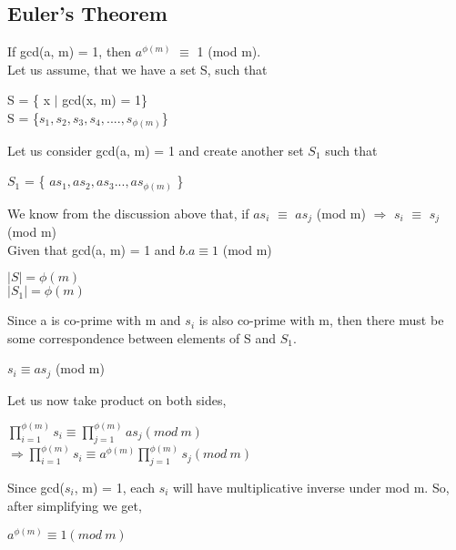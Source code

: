 \documentclass[11pt]{article}
\begin{document}
\begin{itemize}
    \subsection{Euler's Theorem}
    If gcd(a, m) = 1, then $a^{\phi(m)}$ $\equiv$ 1 (mod m).\\
    Let us assume, that we have a set S, such that
    \begin{center}
        S = \{ x $|$ gcd(x, m) = 1\}\\
        S = \{$s_1, s_2, s_3, s_4,....,s_{\phi(m)}$\}
    \end{center}
    Let us consider gcd(a, m) = 1 and create another set $S_1$ such that
    \begin{center}
        $S_1$ = \{ $as_1, as_2, as_3...,as_{\phi(m)}$ \}
    \end{center}
    We know from the discussion above that, if $as_i$ $\equiv$ $as_j$ (mod m) $\Rightarrow$ $s_i$ $\equiv$ $s_j$(mod m)\\
    Given that gcd(a, m) = 1 and $b.a \equiv 1 $ (mod m)
    \begin{center}
        $|S| = \phi(m)$\\
        $|S_1| = \phi(m)$
    \end{center}
    Since a is co-prime with m and $s_i$ is also co-prime with m, then there must be some correspondence between elements of S and $S_1$.
    \begin{center}
        $s_i \equiv as_j$ (mod m)
    \end{center}
    Let us now take product on both sides,
    \begin{center}
        $ \prod_{i=1}^{\phi(m)} s_i   \equiv  \prod_{j=1}^{\phi(m)} as_j  (mod\ m)$ \\
        \vspace{2mm}
        $\Rightarrow \prod_{i=1}^{\phi(m)} s_i  \equiv  a^{\phi(m)}\prod_{j=1}^{\phi(m)} s_j  (mod\ m)$
    \end{center}
    Since gcd($s_i$, m) = 1, each $s_i$ will have multiplicative inverse under mod m. So, after simplifying we get,
    \begin{center}
        $a^{\phi(m)} \equiv 1 ( mod\ m)$
    \end{center}

\end{itemize}
\end{document}
